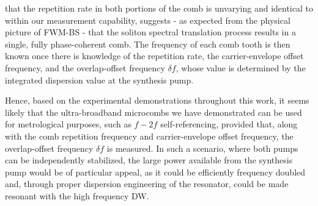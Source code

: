 \documentclass[reprint,superscriptaddress, amsmath,amssymb,pra, aps,floatfix,longbibliography]{revtex4-1}
\begin{document}
that the repetition rate in both portions of the comb is unvarying and identical to within our measurement capability, suggests - as expected from the physical picture of FWM-BS - that the soliton spectral translation process results in a single, fully phase-coherent comb. The frequency of each comb tooth is then known once there is knowledge of the repetition rate, the carrier-envelope offset frequency, and the overlap-offset frequency $\delta f$, whose value is determined by the integrated dispersion value at the synthesis pump.

{\indent}Hence, based on the experimental demonstrations throughout this work, it seems likely that the ultra-broadband microcombs we have demonstrated can be used for metrological purposes, such as $f-2f$ self-referencing, provided that, along with the comb repetition frequency and carrier-envelope offset frequency, the overlap-offset frequency $\delta f$ is measured. In such a scenario, where both pumps can be independently stabilized, the large power available from the synthesis pump would be of particular appeal, as it could be efficiently frequency doubled and, through proper dispersion engineering of the resonator, could be made resonant with the high frequency DW. \\
%
%
%
\end{document}
